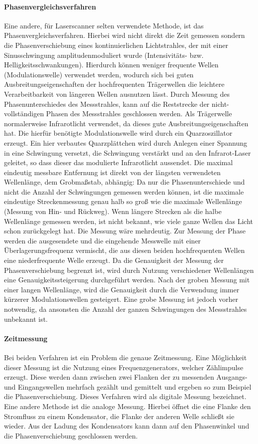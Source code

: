 \documentclass[a4paper,12pt,bibliography=totoc, listof=totoc,titlepage,pointlessnumbers]{scrreprt}
\begin{document}
\paragraph{Phasenvergleichsverfahren}
Eine andere, für Laserscanner selten verwendete Methode, ist das Phasenvergleichsverfahren. Hierbei wird nicht direkt die Zeit gemessen sondern die Phasenverschiebung eines kontinuierlichen Lichtstrahles, der mit einer Sinusschwingung amplitudenmoduliert wurde (Intensivitäts- bzw. Helligkeitsschwankungen). Hierdurch können weniger frequente Wellen (Modulationswelle) verwendet werden, wodurch sich bei guten Ausbreitungseigenschaften der hochfrequenten Trägerwellen die leichtere Verarbeitbarkeit von längeren Wellen ausnutzen lässt. Durch Messung des Phasenunterschiedes des Messstrahles, kann auf die Reststrecke der nicht-vollständigen Phasen des Messstrahles geschlossen werden. Als Trägerwelle normalerweise Infrarotlicht verwendet, da dieses gute Ausbreitungseigenschaften hat. Die hierfür benötigte Modulationswelle wird durch ein Quarzoszillator erzeugt. Ein hier verbautes Quarzplättchen wird durch Anlegen einer Spannung in eine Schwingung versetzt, die Schwingung verstärkt und an den Infrarot-Laser geleitet, so dass dieser das modulierte Infrarotlicht aussendet. Die maximal eindeutig messbare Entfernung ist direkt von der längsten verwendeten Wellenlänge, dem Grobmaßstab, abhängig: Da nur die Phasenunterschiede und nicht die Anzahl der Schwingungen gemessen werden können, ist die maximale eindeutige  Streckenmessung genau halb so groß wie die maximale Wellenlänge (Messung von Hin- und Rückweg). Wenn längere Strecken als die halbe Wellenlänge gemessen werden, ist nicht bekannt, wie viele ganze Wellen das Licht schon zurückgelegt hat. Die Messung wäre mehrdeutig. Zur Messung der Phase werden die ausgesendete und die eingehende Messwelle mit einer Überlagerungsfrequenz vermischt, die aus diesen beiden hochfrequenten Wellen eine niederfrequente Welle erzeugt. Da die Genauigkeit der Messung der Phasenverschiebung begrenzt ist, wird durch Nutzung verschiedener Wellenlängen eine Genauigkeitssteigerung durchgeführt werden. Nach der groben Messung mit einer langen Wellenlänge, wird die Genauigkeit durch die Verwendung immer kürzerer Modulationswellen gesteigert. Eine grobe Messung ist jedoch vorher notwendig, da ansonsten die Anzahl der ganzen Schwingungen des Messstrahles unbekannt ist. \citep[S. 311ff]{Witte2006}

\paragraph{Zeitmessung}
Bei beiden Verfahren ist ein Problem die genaue Zeitmessung. Eine Möglichkeit dieser Messung ist die Nutzung eines Frequenzgenerators, welcher Zählimpulse erzeugt. Diese werden dann zwischen zwei Flanken der zu messenden Ausgangs- und Eingangswellen mehrfach gezählt und gemittelt und ergeben so zum Beispiel die Phasenverschiebung. Dieses Verfahren wird als digitale Messung bezeichnet. Eine andere Methode ist die analoge Messung. Hierbei öffnet die eine Flanke den Stromfluss zu einem Kondensator, die Flanke der anderen Welle schließt sie wieder. Aus der Ladung des Kondensators kann dann auf den Phasenwinkel und die Phasenverschiebung geschlossen werden.  \citep[S. 314f]{Witte2006}
\end{document}
